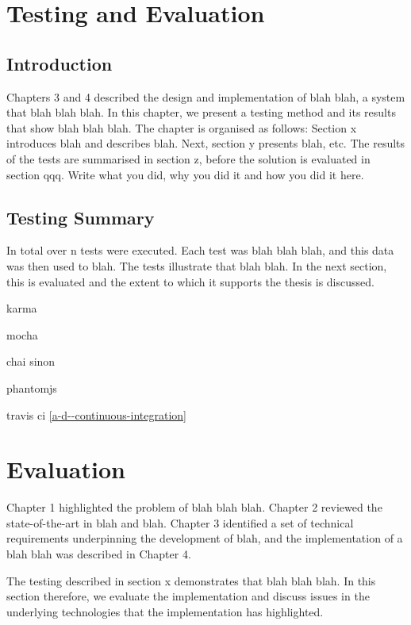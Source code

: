 \section{Testing and Evaluation} \label{s-i--testing-and-evaluation}

\subsection{Introduction} \label{s-i--t-a-e--i}

Chapters 3 and 4 described the design and implementation of blah blah, a system that blah blah blah.  In this chapter, we present a testing method and its results that show blah blah blah.  The chapter is organised as follows:  Section x introduces blah and describes blah.  Next, section y presents blah, etc.
The results of the tests are summarised in section z, before the solution is evaluated in section qqq.
Write what you did, why you did it and how you did it here.

\subsection{Testing Summary} \label{s-i--testing-summary}

In total over n tests were executed. Each test was blah blah blah, and this data was then used to blah. The tests illustrate that blah blah. In the next section, this is evaluated and the extent to which it supports the thesis is discussed.

karma

mocha

chai
sinon

phantomjs

travis ci \ref{a-d--continuous-integration}

\section{Evaluation} \label{s-i--evaluation}

Chapter 1 highlighted the problem of blah blah blah. Chapter 2 reviewed the state-of-the-art in blah and blah.  Chapter 3 identified a set of technical requirements underpinning the development of blah, and the implementation of a blah blah was described in Chapter 4.

The testing described in section x demonstrates that blah blah blah. In this section therefore, we evaluate the implementation and discuss issues in the underlying technologies that the implementation has highlighted.

